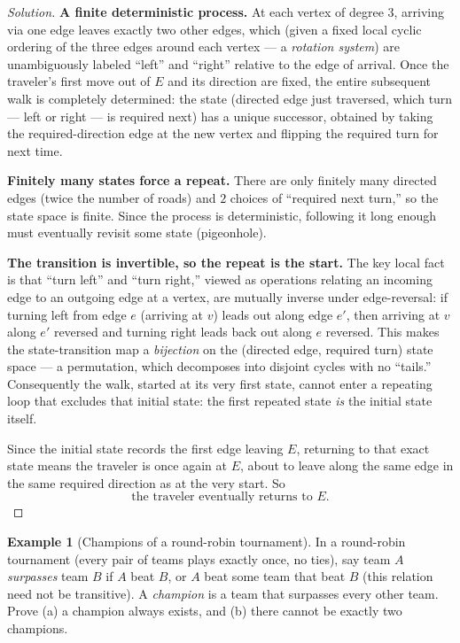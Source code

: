 \documentclass[11pt]{article}
\theoremstyle{definition}
\newtheorem{example}{Example}[section]
\begin{document}
\begin{proof}[Solution]
\textbf{A finite deterministic process.} At each vertex of degree $3$, arriving via one edge leaves exactly two other edges, which (given a fixed local cyclic ordering of the three edges around each vertex — a \emph{rotation system}) are unambiguously labeled ``left'' and ``right'' relative to the edge of arrival. Once the traveler's first move out of $E$ and its direction are fixed, the entire subsequent walk is completely determined: the state (directed edge just traversed, which turn — left or right — is required next) has a unique successor, obtained by taking the required-direction edge at the new vertex and flipping the required turn for next time.

\textbf{Finitely many states force a repeat.} There are only finitely many directed edges (twice the number of roads) and $2$ choices of ``required next turn,'' so the state space is finite. Since the process is deterministic, following it long enough must eventually revisit some state (pigeonhole).

\textbf{The transition is invertible, so the repeat is the start.} The key local fact is that ``turn left'' and ``turn right,'' viewed as operations relating an incoming edge to an outgoing edge at a vertex, are mutually inverse under edge-reversal: if turning left from edge $e$ (arriving at $v$) leads out along edge $e'$, then arriving at $v$ along $e'$ reversed and turning right leads back out along $e$ reversed. This makes the state-transition map a \emph{bijection} on the (directed edge, required turn) state space — a permutation, which decomposes into disjoint cycles with no ``tails.'' Consequently the walk, started at its very first state, cannot enter a repeating loop that excludes that initial state: the first repeated state \emph{is} the initial state itself.

Since the initial state records the first edge leaving $E$, returning to that exact state means the traveler is once again at $E$, about to leave along the same edge in the same required direction as at the very start. So
\[
\boxed{\text{the traveler eventually returns to } E}.
\]
\end{proof}

\begin{example}[Champions of a round-robin tournament]
In a round-robin tournament (every pair of teams plays exactly once, no ties), say team $A$ \emph{surpasses} team $B$ if $A$ beat $B$, or $A$ beat some team that beat $B$ (this relation need not be transitive). A \emph{champion} is a team that surpasses every other team. Prove (a) a champion always exists, and (b) there cannot be exactly two champions.
\end{example}
\end{document}
